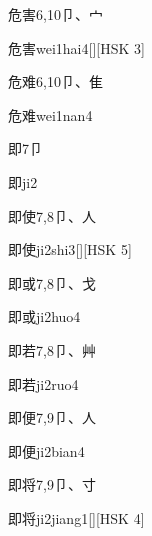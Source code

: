 \begin{entry}{危害}{6,10}{⼙、⼧}
  \begin{phonetics}{危害}{wei1hai4}[][HSK 3]
  \end{phonetics}
\end{entry}

\begin{entry}{危难}{6,10}{⼙、⾫}
  \begin{phonetics}{危难}{wei1nan4}
  \end{phonetics}
\end{entry}

\begin{entry}{即}{7}{⼙}
  \begin{phonetics}{即}{ji2}
  \end{phonetics}
\end{entry}

\begin{entry}{即使}{7,8}{⼙、⼈}
  \begin{phonetics}{即使}{ji2shi3}[][HSK 5]
  \end{phonetics}
\end{entry}

\begin{entry}{即或}{7,8}{⼙、⼽}
  \begin{phonetics}{即或}{ji2huo4}
  \end{phonetics}
\end{entry}

\begin{entry}{即若}{7,8}{⼙、⾋}
  \begin{phonetics}{即若}{ji2ruo4}
  \end{phonetics}
\end{entry}

\begin{entry}{即便}{7,9}{⼙、⼈}
  \begin{phonetics}{即便}{ji2bian4}
  \end{phonetics}
\end{entry}

\begin{entry}{即将}{7,9}{⼙、⼨}
  \begin{phonetics}{即将}{ji2jiang1}[][HSK 4]
  \end{phonetics}
\end{entry}

